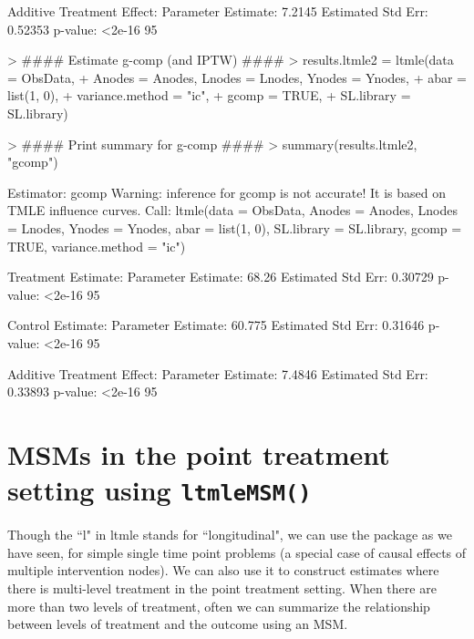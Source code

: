 \documentclass[answers]{exam}
\begin{document}
\begin{solution}
\begin{Schunk}
\begin{Soutput}
Additive Treatment Effect:
   Parameter Estimate:  7.2145 
    Estimated Std Err:  0.52353 
              p-value:  <2e-16 
    95%
\end{Soutput}
\end{Schunk}
\begin{Schunk}
\begin{Sinput}
> #### Estimate g-comp (and IPTW) ####
> results.ltmle2 = ltmle(data = ObsData, 
+                        Anodes = Anodes, Lnodes = Lnodes, Ynodes = Ynodes, 
+                        abar = list(1, 0),
+                        variance.method = "ic", 
+                        gcomp = TRUE, 
+                        SL.library = SL.library)
\end{Sinput}
\end{Schunk}
\begin{Schunk}
\begin{Sinput}
> #### Print summary for g-comp ####
> summary(results.ltmle2, "gcomp")
\end{Sinput}
\begin{Soutput}
Estimator:  gcomp 
Warning: inference for gcomp is not accurate! It is based on TMLE influence curves.
Call:
ltmle(data = ObsData, Anodes = Anodes, Lnodes = Lnodes, Ynodes = Ynodes, 
    abar = list(1, 0), SL.library = SL.library, gcomp = TRUE, 
    variance.method = "ic")

Treatment Estimate:
   Parameter Estimate:  68.26 
    Estimated Std Err:  0.30729 
              p-value:  <2e-16 
    95%

Control Estimate:
   Parameter Estimate:  60.775 
    Estimated Std Err:  0.31646 
              p-value:  <2e-16 
    95%

Additive Treatment Effect:
   Parameter Estimate:  7.4846 
    Estimated Std Err:  0.33893 
              p-value:  <2e-16 
    95%
\end{Soutput}
\end{Schunk}
\end{solution}


\section{MSMs in the point treatment setting using \texttt{ltmleMSM()}}


Though the ``l" in ltmle stands for ``longitudinal", we can use the package as we have seen, for simple single time point problems (a special case of causal effects of multiple intervention nodes). We can also use it to construct estimates where there is multi-level treatment in the point treatment setting. When there are more than two levels of treatment, often we can summarize the relationship between levels of treatment and the outcome using an MSM. 
\end{document}
